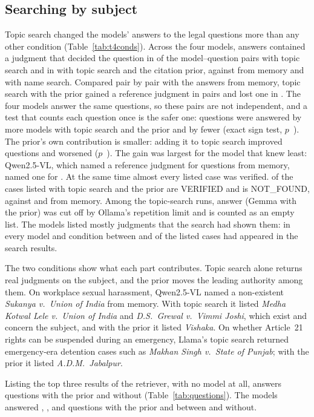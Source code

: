 \subsection{Searching by subject}
\label{sec:topicres}
Topic search changed the models' answers to the legal questions more than any other condition (Table~\ref{tab:t4conds}). Across the four models, answers contained a judgment that decided the question in \RefAllTopic{} of the \RefQuestionsAll{} model--question pairs with topic search and in \RefAllTopicPrior{} with topic search and the citation prior, against \RefAllClosed{} from memory and \RefAllName{} with name search. Compared pair by pair with the answers from memory, topic search with the prior gained a reference judgment in \PairClosedTopicPriorGained{} pairs and lost one in \PairClosedTopicPriorLost{}. The four models answer the same \NumTopics{} questions, so these pairs are not independent, and a test that counts each question once is the safer one: \SignClosedTopicPriorBetter{} questions were answered by more models with topic search and the prior and \SignClosedTopicPriorWorse{} by fewer (exact sign test, $p$~\SignClosedTopicPriorP). The prior's own contribution is smaller: adding it to topic search improved \SignTopicTopicPriorBetter{} questions and worsened \SignTopicTopicPriorWorse{} ($p$~\SignTopicTopicPriorP). The gain was largest for the model that knew least: Qwen2.5-VL, which named a reference judgment for \RefClosedQwenVL{} questions from memory, named one for \RefTopicPriorQwenVL{}. At the same time almost every listed case was verified. \VerPctAllTopicPrior{} of the \CasesAllTopicPrior{} cases listed with topic search and the prior are VERIFIED and \NFAllTopicPrior{} is NOT\_FOUND, against \VerPctAllClosed{} and \NFAllClosed{} from memory. Among the topic-search runs, \TopicAborted{} answer (Gemma with the prior) was cut off by Ollama's repetition limit and is counted as an empty list. The models listed mostly judgments that the search had shown them: in every model and condition between \ShownTopicQwen{} and \ShownTopicGemma{} of the listed cases had appeared in the search results.

The two conditions show what each part contributes. Topic search alone returns real judgments on the subject, and the prior moves the leading authority among them. On workplace sexual harassment, Qwen2.5-VL named a non-existent \emph{Sukanya v.\ Union of India} from memory. With topic search it listed \emph{Medha Kotwal Lele v.\ Union of India} and \emph{D.S.\ Grewal v.\ Vimmi Joshi}, which exist and concern the subject, and with the prior it listed \emph{Vishaka}. On whether Article~21 rights can be suspended during an emergency, Llama's topic search returned emergency-era detention cases such as \emph{Makhan Singh v.\ State of Punjab}; with the prior it listed \emph{A.D.M.\ Jabalpur}.

Listing the top three results of the retriever, with no model at all, answers \QHybridPriorHitThree{} questions with the prior and \QHybridHitThree{} without (Table~\ref{tab:questions}). The models answered \RefTopicPriorLlama, \RefTopicPriorQwen, \RefTopicPriorGemma{} and \RefTopicPriorQwenVL{} questions with the prior and between \RefTopicQwen{} and \RefTopicLlama{} without.
